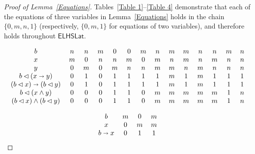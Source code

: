 \documentclass[reqno,a4paper]{amsart}
\theoremstyle{remark}
\theoremstyle{definition}
\newcommand{\iimplies}{\shortrightarrow}
\newcommand{\ELHSLat}{\ensuremath{\mathsf{ELHSLat}}}
\begin{document}
\begin{proof}[Proof of Lemma~\ref{Equations}]
	Tables~\ref{Table 1}--\ref{Table 4} demonstrate that each of the equations of three variables in Lemma~\ref{Equations} holds in the chain \(\{0,m,n,1\}\) (respectively, \(\{0,m,1\}\) for equations of two variables), and therefore holds throughout \(\ELHSLat\).
	\begin{table}
		\[
			\begin{tabular}{c  c c c c c c c c c c c c c}
				\(b\)                           & \(n\) & \(n\) & \(m\) & \(0\) & \(0\) & \(m\) & \(n\) & \(m\) & \(m\) & \(n\) & \(n\) & \(m\) & \(n\) \\
				\(x\)                           & \(m\) & \(0\) & \(n\) & \(n\) & \(m\) & \(0\) & \(m\) & \(n\) & \(m\) & \(n\) & \(m\) & \(n\) & \(n\) \\
				\(y\)                           & \(0\) & \(m\) & \(0\) & \(m\) & \(n\) & \(n\) & \(m\) & \(m\) & \(n\) & \(m\) & \(n\) & \(n\) & \(n\) \\
				\(b\lhd (x\iimplies y)\)        & \(0\) & \(1\) & \(0\) & \(1\) & \(1\) & \(1\) & \(1\) & \(m\) & \(1\) & \(m\) & \(1\) & \(1\) & \(1\) \\
				\((b\lhd x)\iimplies(b\lhd y)\) & \(0\) & \(1\) & \(0\) & \(1\) & \(1\) & \(1\) & \(1\) & \(m\) & \(1\) & \(m\) & \(1\) & \(1\) & \(1\) \\
				\(b\lhd (x\wedge y)\)           & \(0\) & \(0\) & \(0\) & \(1\) & \(1\) & \(0\) & \(m\) & \(m\) & \(m\) & \(m\) & \(m\) & \(1\) & \(n\) \\
				\((b\lhd x)\wedge (b\lhd y)\)   & \(0\) & \(0\) & \(0\) & \(1\) & \(1\) & \(0\) & \(m\) & \(m\) & \(m\) & \(m\) & \(m\) & \(1\) & \(n\) \\
			\end{tabular}
		\]
		\caption{Identities (1) and (2) of Lemma~\ref{Equations}}\label{Table 1}
	\end{table}
	\begin{table}
		\[
			\begin{tabular}{c c c c}
				\(b\)                                                           &
				\(m\)                                                           & \(0\) & \(m\) \\
				\(x\)                                                           &
				\(0\)                                                           & \(m\) & \(m\) \\
				\(b\iimplies x\)                                                &
				\(0\)                                                           & \(1\) & \(1\) \\

\end{tabular}\]
\end{table}
\end{proof}
\end{document}
